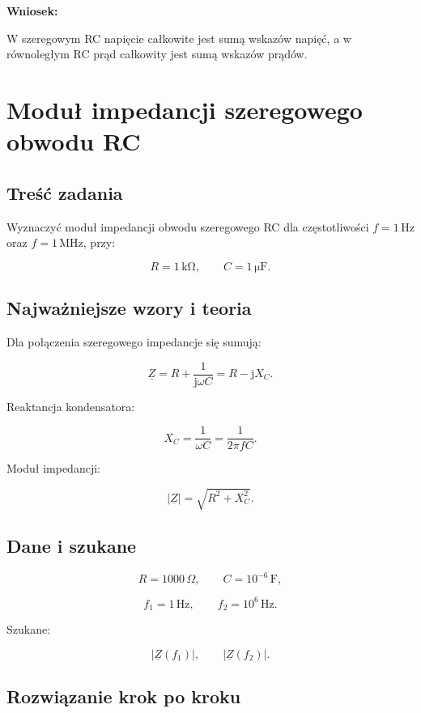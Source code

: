 \documentclass[12pt,a4paper]{article}
\newcommand{\jw}{\mathrm{j}\omega}
\newcommand{\Z}{\underline{Z}}
\begin{document}
\textbf{Wniosek:}

W szeregowym RC napięcie całkowite jest sumą wskazów napięć,
a w równoległym RC prąd całkowity jest sumą wskazów prądów.

\newpage

\section{Moduł impedancji szeregowego obwodu RC}

\subsection*{Treść zadania}

Wyznaczyć moduł impedancji obwodu szeregowego RC dla częstotliwości
$f=1\,\mathrm{Hz}$ oraz $f=1\,\mathrm{MHz}$, przy:

\[
R=1\,\mathrm{k\Omega},
\qquad
C=1\,\mathrm{\mu F}.
\]

\subsection*{Najważniejsze wzory i teoria}

Dla połączenia szeregowego impedancje się sumują:

\[
\Z=R+\frac{1}{\jw C}
=R-\mathrm{j}X_C.
\]

Reaktancja kondensatora:

\[
X_C=\frac{1}{\omega C}
=\frac{1}{2\pi fC}.
\]

Moduł impedancji:

\[
|\Z|=\sqrt{R^2+X_C^2}.
\]

\subsection*{Dane i szukane}

\[
R=1000\,\Omega,
\qquad
C=10^{-6}\,\mathrm{F},
\]

\[
f_1=1\,\mathrm{Hz},
\qquad
f_2=10^6\,\mathrm{Hz}.
\]

Szukane:

\[
|\Z(f_1)|,\qquad |\Z(f_2)|.
\]

\subsection*{Rozwiązanie krok po kroku}
\end{document}
